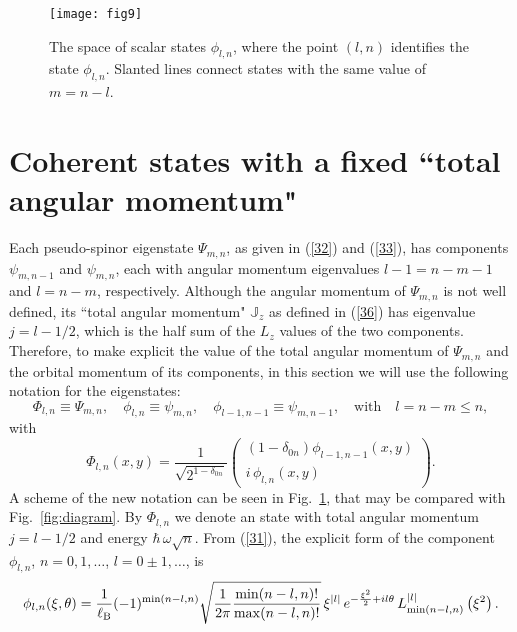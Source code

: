 \documentclass[aps,showpacs,showkeys]{revtex4}
\begin{document}
\begin{figure}[htb]
	\centering
	\texttt{[image: fig9]}
	\caption{\label{fig:diagramLN} 
		The space of scalar states $\phi_{l,n}$, where the point $(l,n)$ identifies the state $\phi_{l,n}$. Slanted lines connect states with the same value of $m=n-l$.}
\end{figure}

\section{Coherent states with a fixed ``total angular momentum"}\label{sec4}

Each pseudo-spinor eigenstate $\Psi_{m,n}$, as given in (\ref{32}) and (\ref{33}), has components $\psi_{m,n-1}$ and $\psi_{m,n}$, each with angular momentum eigenvalues $l-1=n-m-1$ and $l=n-m$, respectively. Although the angular momentum of $\Psi_{m,n}$ is not well defined, its ``total angular momentum" $\mathbb{J}_{z}$ as defined in (\ref{36}) has eigenvalue $j=l-1/2$, which is the half sum of the $L_{z}$ values of the two components. Therefore, to make explicit the value of the total angular momentum of $\Psi_{m,n}$ and the orbital momentum of its components,  in this section we will use the following notation for the eigenstates:
\begin{equation}
 \Phi_{l,n}\equiv\Psi_{m,n}, \quad \phi_{l,n}\equiv\psi_{m,n}, \quad \phi_{l-1,n-1}\equiv\psi_{m,n-1}, \quad \textrm{with} \quad l=n-m\leq n,
\end{equation}
with
\begin{equation}\label{88}
\Phi_{l,n}(x,y)=\frac{1}{\sqrt{2^{1-\delta_{0n}}}}\left(\begin{array}{c}
(1-\delta_{0n})\phi_{l-1,n-1}(x,y) \\
i\,\phi_{l,n}(x,y)
\end{array}\right).
\end{equation}
A scheme of the new notation can be seen in Fig.~\ref{fig:diagramLN}, that may be compared with Fig.~\ref{fig:diagram}.
By $\Phi_{l,n}$ we denote an state with total angular momentum $j=l-1/2$ and energy $\hbar\,\omega\sqrt{n}$. From (\ref{31}), the explicit form of the component $\phi_{l,n}$, $n=0,1,\dots$, $l=0\pm1,\dots$, is
\begin{equation}\label{89}
  \phi_{l,n}(\xi,\theta)=\frac1{\ell_{\rm B}}(-1)^{\min(n-l,n)}\sqrt{\frac{1}{2\pi}\frac{\min(n-l,n)!}{\max(n-l,n)!}}\,  \xi^{\vert l\vert}
\, e^{-\frac{\xi^2}{2}+il\theta}\,   L_{\min(n-l,n)}^{\vert l\vert}\left(\xi^2\right).
\end{equation}
\end{document}
